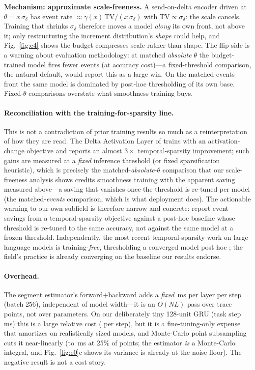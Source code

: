 \documentclass[10pt]{article}
\begin{document}
\textbf{Mechanism: approximate scale-freeness.} A send-on-delta encoder
driven at $\theta = x\,\sigma_\delta$ has event rate $\approx
\gamma(x)\,\mathrm{TV}/(x\,\sigma_\delta)$ with $\mathrm{TV}\propto
\sigma_\delta$: the scale cancels. Training that shrinks $\sigma_\delta$
therefore moves a model \emph{along} its own front, not above it; only
restructuring the increment distribution's \emph{shape} could help, and
Fig.~\ref{fig:e4} shows the budget compresses scale rather than shape. The
flip side is a warning about evaluation methodology: at matched
\emph{absolute} $\theta$ the budget-trained model fires
\AbsThetaSavingPsMNIST{} fewer events (at \AbsThetaCostPsMNIST{} accuracy
cost)---a fixed-threshold comparison, the natural default, would report
this as a large win. On the matched-events front the same model is
dominated by post-hoc thresholding of its own base. Fixed-$\theta$
comparisons overstate what smoothness training buys.

\paragraph{Reconciliation with the training-for-sparsity line.}
This is not a contradiction of prior training results so much as a
reinterpretation of how they are read. The Delta Activation Layer of
\citet{yousefzadeh2021training} trains with an activation-change objective
and reports an almost $3\times$ temporal-sparsity improvement; such gains are
measured at a \emph{fixed} inference threshold (or fixed sparsification
heuristic), which is precisely the matched-\emph{absolute}-$\theta$
comparison that our scale-freeness analysis shows credits smoothness training
with the \AbsThetaSavingPsMNIST{} apparent saving measured above---a
saving that vanishes once the threshold is re-tuned per model (the
matched-\emph{events} comparison, which is what deployment does). The
actionable warning to our own subfield is therefore narrow and concrete:
report event savings from a temporal-sparsity objective against a post-hoc
baseline whose threshold is re-tuned to the same accuracy, not against the
same model at a frozen threshold. Independently, the most recent
temporal-sparsity work on large language models is training-\emph{free},
thresholding a converged model post hoc \citep{qi2025deltallm}; the field's
practice is already converging on the baseline our results endorse.

\paragraph{Overhead.} The segment estimator's forward+backward adds a
\emph{fixed} \EstimatorMs\,ms per layer per step (batch 256), independent of
model width---it is an $O(NL)$ pass over trace points, not over parameters.
On our deliberately tiny 128-unit GRU (task step \TaskOnlyMs\,ms) this is a
large relative cost (\OverheadFactor{} per step), but it is a
fine-tuning-only expense that amortizes on realistically sized models, and
Monte-Carlo point subsampling cuts it near-linearly (to \EstimatorQuarterMs
\,ms at 25\% of points; the estimator \emph{is} a Monte-Carlo integral, and
Fig.~\ref{fig:e0}c shows its variance is already at the noise floor). The
negative result is not a cost story.
\end{document}
